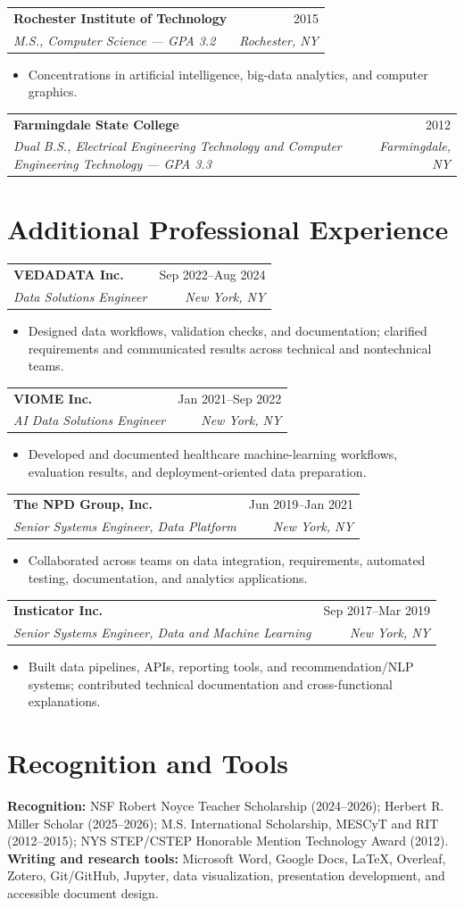 \documentclass[10pt,letterpaper]{article}
\makeatletter
\newcommand{\entry}[4]{%
  \noindent\begin{tabularx}{\textwidth}{@{}Xr@{}}
    \textbf{#1} & #2 \\
    \textit{#3} & \textit{#4}
  \end{tabularx}\vspace{-1pt}
}
\makeatother
\begin{document}
\entry{Rochester Institute of Technology}{2015}{M.S., Computer Science --- GPA 3.2}{Rochester, NY}
\begin{itemize}
  \item Concentrations in artificial intelligence, big-data analytics, and computer graphics.
\end{itemize}

\entry{Farmingdale State College}{2012}{Dual B.S., Electrical Engineering Technology and Computer Engineering Technology --- GPA 3.3}{Farmingdale, NY}

\section*{Additional Professional Experience}

\entry{VEDADATA Inc.}{Sep 2022--Aug 2024}{Data Solutions Engineer}{New York, NY}
\begin{itemize}
  \item Designed data workflows, validation checks, and documentation; clarified requirements and communicated results across technical and nontechnical teams.
\end{itemize}

\entry{VIOME Inc.}{Jan 2021--Sep 2022}{AI Data Solutions Engineer}{New York, NY}
\begin{itemize}
  \item Developed and documented healthcare machine-learning workflows, evaluation results, and deployment-oriented data preparation.
\end{itemize}

\entry{The NPD Group, Inc.}{Jun 2019--Jan 2021}{Senior Systems Engineer, Data Platform}{New York, NY}
\begin{itemize}
  \item Collaborated across teams on data integration, requirements, automated testing, documentation, and analytics applications.
\end{itemize}

\entry{Insticator Inc.}{Sep 2017--Mar 2019}{Senior Systems Engineer, Data and Machine Learning}{New York, NY}
\begin{itemize}
  \item Built data pipelines, APIs, reporting tools, and recommendation/NLP systems; contributed technical documentation and cross-functional explanations.
\end{itemize}

\section*{Recognition and Tools}
\textbf{Recognition:} NSF Robert Noyce Teacher Scholarship (2024--2026); Herbert R. Miller Scholar (2025--2026); M.S. International Scholarship, MESCyT and RIT (2012--2015); NYS STEP/CSTEP Honorable Mention Technology Award (2012).\\[2pt]
\textbf{Writing and research tools:} Microsoft Word, Google Docs, LaTeX, Overleaf, Zotero, Git/GitHub, Jupyter, data visualization, presentation development, and accessible document design.
\end{document}
